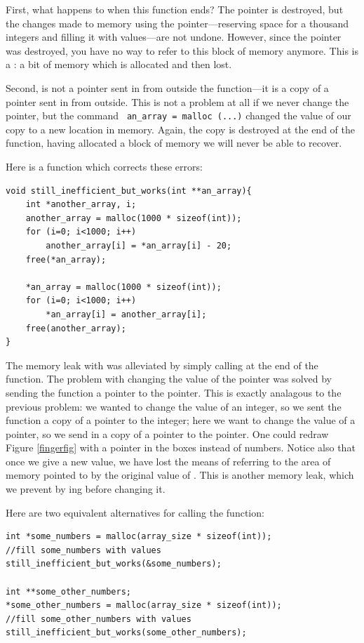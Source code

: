 \documentclass[12pt]{article}
\begin{document}
First, what happens to  when this function
ends? The pointer is destroyed, but the changes made to memory using
the pointer---reserving space for a thousand integers and filling it
with values---are not undone. However, since the pointer was destroyed,
you have no way to refer to this block of memory anymore.  This is a
: a bit of memory which is allocated and then lost.

Second,  is not a pointer sent in from outside the
function---it is a copy of a pointer sent in from outside. This is not
a problem at all if we never change the pointer, but the command {\tt
an\_array = malloc (...)} changed the value of our copy 
to a new location in memory.  Again, the copy is destroyed at the end
of the function, having allocated a block of memory we will never be
able to recover.

Here is a function which corrects these errors:

\begin{lstlisting}
void still_inefficient_but_works(int **an_array){
    int *another_array, i;
    another_array = malloc(1000 * sizeof(int));
    for (i=0; i<1000; i++)
        another_array[i] = *an_array[i] - 20;
    free(*an_array);

    *an_array = malloc(1000 * sizeof(int));
    for (i=0; i<1000; i++)
        *an_array[i] = another_array[i];
    free(another_array);
}
\end{lstlisting}

The memory leak with  was alleviated by simply
calling  at the end of the function. The problem with
changing the value of the pointer was solved by sending the function a
pointer to the pointer. This is exactly analagous to the previous problem:
we wanted to change the value of an integer, so we sent the function a
copy of a pointer to the integer; here we want to change the value of a
pointer, so we send in a copy of a pointer to the pointer. One could
redraw Figure \ref{fingerfig} with a pointer in the boxes instead of
numbers. Notice also
that once we give  a new value, we have lost the
means of referring to the area of memory pointed to by the original
value of . This is another memory leak, which we
prevent by ing  before changing it.

Here are two equivalent alternatives for calling the function:
\begin{lstlisting}
int *some_numbers = malloc(array_size * sizeof(int));
//fill some_numbers with values
still_inefficient_but_works(&some_numbers);

int **some_other_numbers;
*some_other_numbers = malloc(array_size * sizeof(int));
//fill some_other_numbers with values
still_inefficient_but_works(some_other_numbers);
\end{lstlisting}
\end{document}
